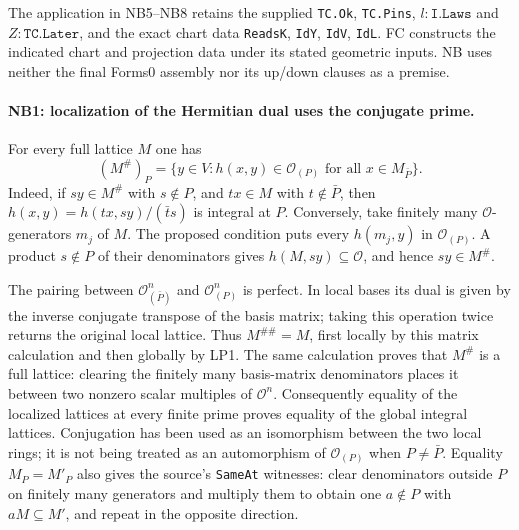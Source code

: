\documentclass[11pt,a4paper]{article}
\numberwithin{equation}{section}
\theoremstyle{remark}\newtheorem{remark}[theorem]{Remark}
\begin{document}
The application in NB5--NB8 retains the supplied
\texttt{TC.Ok}, \texttt{TC.Pins}, $l:\texttt{I.Laws}$ and
$Z:\texttt{TC.Later}$, and the exact chart data
\texttt{ReadsK}, \texttt{IdY}, \texttt{IdV}, \texttt{IdL}.
FC constructs the indicated chart and projection data under its stated
geometric inputs. NB uses neither the final Forms0 assembly nor its
up/down clauses as a premise.

\paragraph{NB1: localization of the Hermitian dual uses the conjugate prime.}
For every full lattice $M$ one has
\[
 (M^\#)_P=\{y\in V:h(x,y)\in\mathcal O_{(P)}
                         \text{ for all }x\in M_{\bar P}\}.
 \tag{NB.1}
\]
Indeed, if $sy\in M^\#$ with $s\notin P$, and $tx\in M$ with
$t\notin\bar P$, then
$h(x,y)=h(tx,sy)/(\bar t s)$ is integral at $P$.
Conversely, take finitely many $\mathcal O$-generators $m_j$ of $M$.
The proposed condition puts every $h(m_j,y)$ in $\mathcal O_{(P)}$.
A product $s\notin P$ of their denominators gives
$h(M,sy)\subseteq\mathcal O$, and hence $sy\in M^\#$.

The pairing between $\mathcal O_{(\bar P)}^n$ and
$\mathcal O_{(P)}^n$ is perfect. In local bases its dual is given by
the inverse conjugate transpose of the basis matrix; taking this
operation twice returns the original local lattice. Thus
$M^{\#\#}=M$, first locally by this matrix calculation and then globally
by LP1. The same calculation proves that $M^\#$ is a full lattice:
clearing the finitely many basis-matrix denominators places it between
two nonzero scalar multiples of $\mathcal O^n$.
Consequently equality of the localized lattices at every finite prime
proves equality of the global integral lattices. Conjugation has been
used as an isomorphism between the two local rings; it is not being
treated as an automorphism of $\mathcal O_{(P)}$ when $P\ne\bar P$.
Equality $M_P=M'_P$ also gives the source's \texttt{SameAt} witnesses:
clear denominators outside $P$ on finitely many generators and multiply
them to obtain one $a\notin P$ with $aM\subseteq M'$, and repeat in
the opposite direction.
\end{document}
